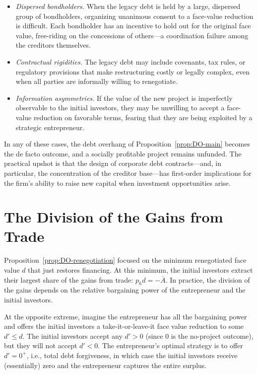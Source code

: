 \documentclass[11pt,a4paper,oneside]{book}
\def\leq{\leqslant}
\theoremstyle{plain}
\theoremstyle{definition}
\theoremstyle{remark}
\numberwithin{equation}{chapter}
\begin{document}
\begin{itemize}
  \item \emph{Dispersed bondholders.}
  When the legacy debt is held by a large, dispersed group of bondholders, organizing unanimous consent to a face-value reduction is difficult.
  Each bondholder has an incentive to hold out for the original face value, free-riding on the concessions of others---a coordination failure among the creditors themselves.
  \item \emph{Contractual rigidities.}
  The legacy debt may include covenants, tax rules, or regulatory provisions that make restructuring costly or legally complex, even when all parties are informally willing to renegotiate.
  \item \emph{Information asymmetries.}
  If the value of the new project is imperfectly observable to the initial investors, they may be unwilling to accept a face-value reduction on favorable terms, fearing that they are being exploited by a strategic entrepreneur.
\end{itemize}

In any of these cases, the debt overhang of Proposition~\ref{prop:DO-main} becomes the de facto outcome, and a socially profitable project remains unfunded.
The practical upshot is that the design of corporate debt contracts---and, in particular, the concentration of the creditor base---has first-order implications for the firm's ability to raise new capital when investment opportunities arise.

\section{The Division of the Gains from Trade}
\label{sec:DO-division}

Proposition~\ref{prop:DO-renegotiation} focused on the minimum renegotiated face value $d$ that just restores financing.
At this minimum, the initial investors extract their largest share of the gains from trade: $p_h d = -\overline{A}$.
In practice, the division of the gains depends on the relative bargaining power of the entrepreneur and the initial investors.

At the opposite extreme, imagine the entrepreneur has all the bargaining power and offers the initial investors a take-it-or-leave-it face value reduction to some $d' \leq d$.
The initial investors accept any $d' > 0$ (since $0$ is the no-project outcome), but they will not accept $d' < 0$.
The entrepreneur's optimal strategy is to offer $d' = 0^+$, i.e., total debt forgiveness, in which case the initial investors receive (essentially) zero and the entrepreneur captures the entire surplus.
\end{document}
